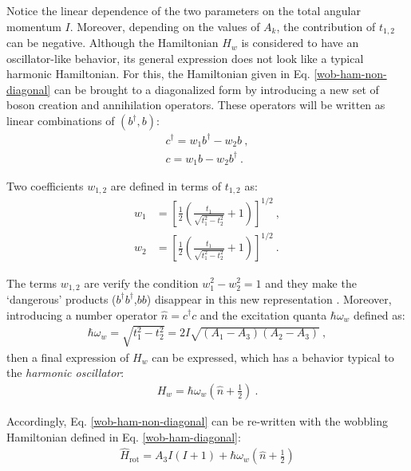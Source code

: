 Notice the linear dependence of the two parameters on the total angular momentum $I$. Moreover, depending on the values of $A_k$, the contribution of $t_{1,2}$ can be negative. Although the Hamiltonian $H_w$ is considered to have an oscillator-like behavior, its general expression does not look like a typical harmonic Hamiltonian. For this, the Hamiltonian given in Eq. \ref{wob-ham-non-diagonal} can be brought to a diagonalized form by introducing a new set of boson creation and annihilation operators. These operators will be written as linear combinations of $(b^\dagger,b)$:
\begin{align}
    c^\dagger=w_1b^\dagger-w_2b\ ,\\
    c=w_1b-w_2b^\dagger\ .
\end{align}

Two coefficients $w_{1,2}$ are defined in terms of $t_{1,2}$ as:
\begin{align}
    w_1&=\left[\frac{1}{2}\left(\frac{t_1}{\sqrt{t_1^2-t_2^2}}+1\right)\right]^{1/2}\ ,\\
    w_2&=\left[\frac{1}{2}\left(\frac{t_1}{\sqrt{t_1^2-t_2^2}}+1\right)\right]^{1/2}\ .
\end{align}

The terms $w_{1,2}$ are verify the condition $w_1^2-w_2^2=1$ and they make the `dangerous' products ($b^\dagger b^\dagger$,$bb$) disappear in this new representation \cite{oi2006semi}. Moreover, introducing a number operator $\hat{n}=c^\dagger c$ and the excitation quanta $\hbar\omega_w$ defined as:
\begin{align}
    \hbar\omega_w=\sqrt{t_1^2-t_2^2}=2I\sqrt{(A_1-A_3)(A_2-A_3)}\ ,
\end{align}
then a final expression of $H_w$ can be expressed, which has a behavior typical to the \emph{harmonic oscillator}:
\begin{align}
    H_w=\hbar\omega_w\left(\hat{n}+\frac{1}{2}\right)\ .
    \label{wob-ham-diagonal}
\end{align}

Accordingly, Eq. \ref{wob-ham-non-diagonal} can be re-written with the wobbling Hamiltonian defined in Eq. \ref{wob-ham-diagonal}:
\begin{align}
    \hat{H}_\text{rot}=A_3I(I+1)+\hbar\omega_w\left(\hat{n}+\frac{1}{2}\right)
\end{align}


